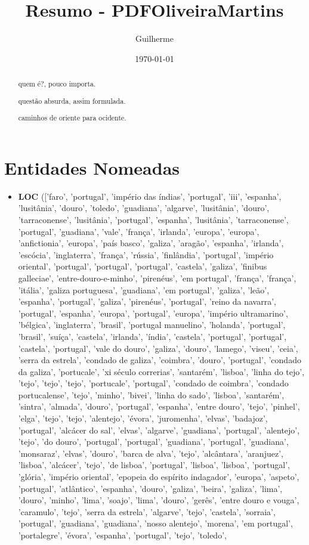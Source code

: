 \documentclass{article}
\title{Resumo - PDFOliveiraMartins}
\author{Guilherme}
\date{\today}
\begin{document}
\maketitle

\begin{abstract}
quem é?, pouco importa.

questão absurda, assim formulada.

caminhos de oriente para ocidente.

\end{abstract}

\section{Entidades Nomeadas}
\begin{itemize}
\item \textbf{LOC} (['faro', 'portugal', 'império das índias', 'portugal', 'iii', 'espanha', 'lusitânia', 'douro', 'toledo', 'guadiana', 'algarve', 'lusitânia', 'douro', 'tarraconense', 'lusitânia', 'portugal', 'espanha', 'lusitânia', 'tarraconense', 'portugal', 'guadiana', 'vale', 'frança', 'irlanda', 'europa', 'europa', 'anfictionia', 'europa', 'país basco', 'galiza', 'aragão', 'espanha', 'irlanda', 'escócia', 'inglaterra', 'frança', 'rússia', 'finlândia', 'portugal', 'império oriental', 'portugal', 'portugal', 'portugal', 'castela', 'galiza', 'finibus galleciae', 'entre-douro-e-minho', 'pirenéus', 'em portugal', 'frança', 'frança', 'itália', 'galiza portuguesa', 'guadiana', 'em portugal', 'galiza', 'leão', 'espanha', 'portugal', 'galiza', 'pirenéus', 'portugal', 'reino da navarra', 'portugal', 'espanha', 'europa', 'portugal', 'europa', 'império ultramarino', 'bélgica', 'inglaterra', 'brasil', 'portugal manuelino', 'holanda', 'portugal', 'brasil', 'suíça', 'castela', 'irlanda', 'índia', 'castela', 'portugal', 'portugal', 'castela', 'portugal', 'vale do douro', 'galiza', 'douro', 'lamego', 'viseu', 'ceia', 'serra da estrela', 'condado de galiza', 'coimbra', 'douro', 'portugal', 'condado da galiza', 'portucale', 'xi século correrias', 'santarém', 'lisboa', 'linha do tejo', 'tejo', 'tejo', 'tejo', 'portucale', 'portugal', 'condado de coimbra', 'condado portucalense', 'tejo', 'minho', 'bivei', 'linha do sado', 'lisboa', 'santarém', 'sintra', 'almada', 'douro', 'portugal', 'espanha', 'entre douro', 'tejo', 'pinhel', 'elga', 'tejo', 'tejo', 'alentejo', 'évora', 'juromenha', 'elvas', 'badajoz', 'portugal', 'alcácer do sal', 'elvas', 'algarve', 'guadiana', 'portugal', 'alentejo', 'tejo', 'do douro', 'portugal', 'portugal', 'guadiana', 'portugal', 'guadiana', 'monsaraz', 'elvas', 'douro', 'barca de alva', 'tejo', 'alcântara', 'aranjuez', 'lisboa', 'alcácer', 'tejo', 'de lisboa', 'portugal', 'lisboa', 'lisboa', 'portugal', 'glória', 'império oriental', 'epopeia do espírito indagador', 'europa', 'aspeto', 'portugal', 'atlântico', 'espanha', 'douro', 'galiza', 'beira', 'galiza', 'lima', 'douro', 'minho', 'lima', 'soajo', 'lima', 'douro', 'gerês', 'entre douro e vouga', 'caramulo', 'tejo', 'serra da estrela', 'algarve', 'tejo', 'castela', 'sorraia', 'portugal', 'guadiana', 'guadiana', 'nosso alentejo', 'morena', 'em portugal', 'portalegre', 'évora', 'espanha', 'portugal', 'tejo', 'toledo', 
\end{itemize}
\end{document}
